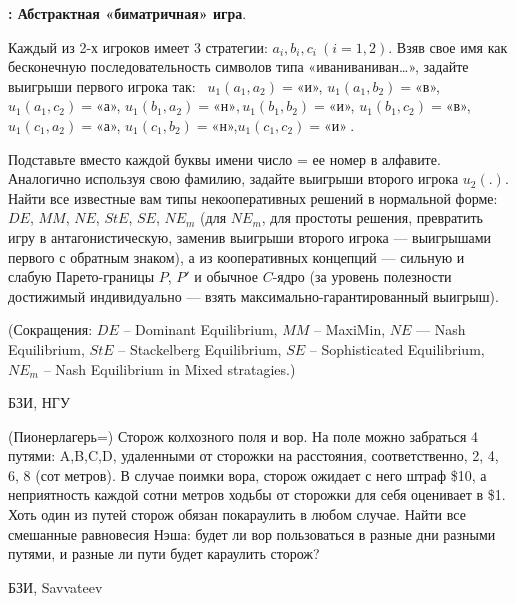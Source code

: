 \begin{problem}
{\bf : Абстрактная «биматричная» игра}. {\rm Каждый из
2-х игроков имеет 3 стратегии: $a_i, b_i, c_i~ (i=1,2)$.
Взяв свое имя как бесконечную последовательность символов
типа «иваниваниван\ldots », задайте выигрыши первого игрока
так:~ $u_1(a_1,a_{2}) = $«и», $ u_1(a_1,b_{2}) = $«в»,$
u_1(a_1,c_{2}) = $«а», $ u_1(b_1,a_{2}) = $«н»$,
u_1(b_1,b_{2}) = $«и», $ u_1(b_1,c_{2}) = $«в»,$
u_1(c_1,a_{2}) = $«а», $ u_1(c_1,b_{2}) = $«н»,$
u_1(c_1,c_{2}) = $«и»$~ $.

Подставьте вместо каждой буквы имени число = ее номер в
алфавите. Аналогично используя свою фамилию, задайте
выигрыши второго игрока $u_2(.)$. Найти все известные вам
типы некооперативных решений в нормальной форме: $DE$,
$MM$, $NE$, $StE$, $SE$, $NE_m$ (для $NE_m$, для простоты
решения, превратить игру в антагонистическую, заменив
выигрыши второго игрока — выигрышами первого с обратным
знаком), а из кооперативных концепций — сильную и слабую
Парето-границы $P$, $P'$ и обычное $C$-ядро (за уровень
полезности достижимый индивидуально
--- взять максимально-гарантированный выигрыш).

(Сокращения: $DE$ -- Dominant Equilibrium, $MM$ -- MaxiMin,
$NE$ — Nash Equilibrium, $StE$ -- Stackelberg Equilibrium,
$SE$ -- Sophisticated Equilibrium, $NE_m$ -- Nash
Equilibrium in Mixed stratagies.) }



\begin{sol}

\end{sol}
\end{problem}


\begin{source}
БЗИ, НГУ
\end{source}




\begin{problem}
 (Пионерлагерь=) Сторож колхозного поля и вор. На
поле можно забраться 4 путями: A,B,C,D, удаленными
от сторожки на расстояния, соответственно, 2, 4, 6,
8 (сот метров). В случае поимки вора, сторож
ожидает с него штраф \$10, а неприятность каждой
сотни метров ходьбы от сторожки для себя оценивает
в \$1. Хоть один из путей сторож обязан покараулить
в любом случае. Найти все смешанные равновесия
Нэша: будет ли  вор пользоваться в разные дни
разными путями, и разные ли пути будет караулить
сторож?



\begin{source}
БЗИ, Savvateev
\end{source}


\begin{sol}

\end{sol}
\end{problem}





